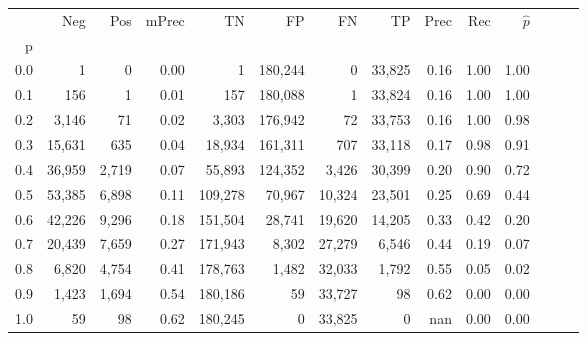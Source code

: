 \begin{tabular}{rrrrrrrrrrrrrr}
\toprule
{} &     Neg &    Pos & mPrec &       TN &       FP &      FN &      TP &  Prec &   Rec & $\hat{p}$ \\
p   &         &        &       &          &          &         &         &       &       &           \\
\midrule
0.0 &       1 &      0 &  0.00 &        1 &  180,244 &       0 &  33,825 &  0.16 &  1.00 &      1.00 \\
0.1 &     156 &      1 &  0.01 &      157 &  180,088 &       1 &  33,824 &  0.16 &  1.00 &      1.00 \\
0.2 &   3,146 &     71 &  0.02 &    3,303 &  176,942 &      72 &  33,753 &  0.16 &  1.00 &      0.98 \\
0.3 &  15,631 &    635 &  0.04 &   18,934 &  161,311 &     707 &  33,118 &  0.17 &  0.98 &      0.91 \\
0.4 &  36,959 &  2,719 &  0.07 &   55,893 &  124,352 &   3,426 &  30,399 &  0.20 &  0.90 &      0.72 \\
0.5 &  53,385 &  6,898 &  0.11 &  109,278 &   70,967 &  10,324 &  23,501 &  0.25 &  0.69 &      0.44 \\
0.6 &  42,226 &  9,296 &  0.18 &  151,504 &   28,741 &  19,620 &  14,205 &  0.33 &  0.42 &      0.20 \\
0.7 &  20,439 &  7,659 &  0.27 &  171,943 &    8,302 &  27,279 &   6,546 &  0.44 &  0.19 &      0.07 \\
0.8 &   6,820 &  4,754 &  0.41 &  178,763 &    1,482 &  32,033 &   1,792 &  0.55 &  0.05 &      0.02 \\
0.9 &   1,423 &  1,694 &  0.54 &  180,186 &       59 &  33,727 &      98 &  0.62 &  0.00 &      0.00 \\
1.0 &      59 &     98 &  0.62 &  180,245 &        0 &  33,825 &       0 &   nan &  0.00 &      0.00 \\
\bottomrule
\end{tabular}
